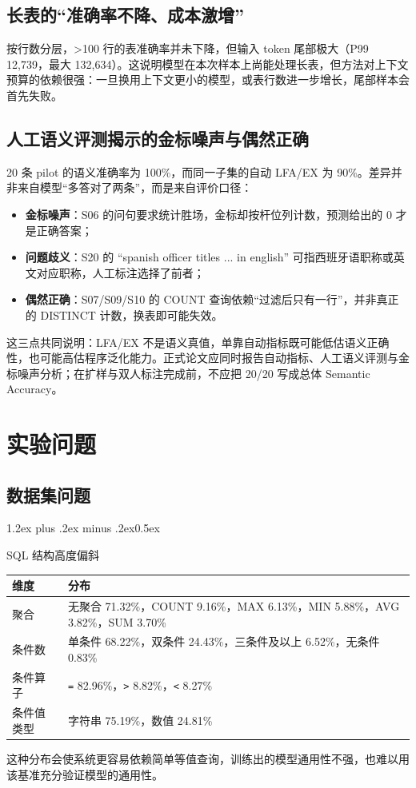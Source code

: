 \documentclass[conference]{IEEEtran}
\makeatletter
\def\subsubsection{\@startsection{subsubsection}{3}{\z@}%
  {1.2ex plus .2ex minus .2ex}{0.5ex}%
  {\normalfont\normalsize\bfseries\raggedright}}
\makeatother
\begin{document}
\subsection{长表的“准确率不降、成本激增”}
按行数分层，\textgreater{}100 行的表准确率并未下降，但输入 token 尾部极大（P99 12,739，最大 132,634）。这说明模型在本次样本上尚能处理长表，但方法对上下文预算的依赖很强：一旦换用上下文更小的模型，或表行数进一步增长，尾部样本会首先失败。
\subsection{人工语义评测揭示的金标噪声与偶然正确}
20 条 pilot 的语义准确率为 100\%，而同一子集的自动 LFA/EX 为 90\%。差异并非来自模型“多答对了两条”，而是来自评价口径：
\begin{itemize}
\item \textbf{金标噪声}：S06 的问句要求统计胜场，金标却按杆位列计数，预测给出的 0 才是正确答案；
\item \textbf{问题歧义}：S20 的 “spanish officer titles ... in english” 可指西班牙语职称或英文对应职称，人工标注选择了前者；
\item \textbf{偶然正确}：S07/S09/S10 的 COUNT 查询依赖“过滤后只有一行”，并非真正的 DISTINCT 计数，换表即可能失效。
\end{itemize}
这三点共同说明：LFA/EX 不是语义真值，单靠自动指标既可能低估语义正确性，也可能高估程序泛化能力。正式论文应同时报告自动指标、人工语义评测与金标噪声分析；在扩样与双人标注完成前，不应把 20/20 写成总体 Semantic Accuracy。
\section{实验问题}
\subsection{数据集问题}
\subsubsection{SQL 结构高度偏斜}
\needspace{2.5cm}
\noindent\begin{minipage}{\linewidth}
\centering
\scriptsize
\begin{tabular}{@{}>{\raggedright\arraybackslash}p{1.82cm}>{\raggedright\arraybackslash}p{5.58cm}@{}}
\toprule
维度 & 分布 \\
\midrule
聚合 & 无聚合 71.32\%，COUNT 9.16\%，MAX 6.13\%，MIN 5.88\%，AVG 3.82\%，SUM 3.70\% \\
条件数 & 单条件 68.22\%，双条件 24.43\%，三条件及以上 6.52\%，无条件 0.83\% \\
条件算子 & \texttt{=} 82.96\%，\texttt{\textgreater{}} 8.82\%，\texttt{\textless{}} 8.27\% \\
条件值类型 & 字符串 75.19\%，数值 24.81\% \\
\bottomrule
\end{tabular}
\end{minipage}\par\smallskip
这种分布会使系统更容易依赖简单等值查询，训练出的模型通用性不强，也难以用该基准充分验证模型的通用性。
\end{document}
